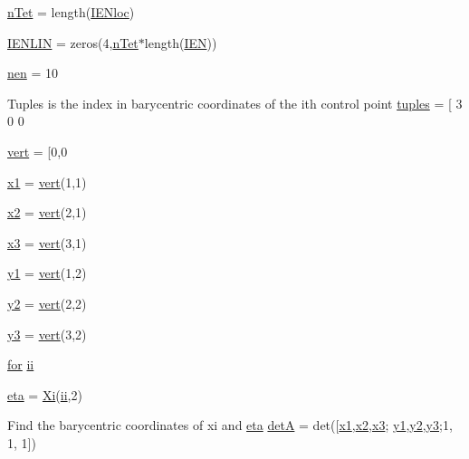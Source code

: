\begin{DoxyCompactItemize}
\item 
\hyperlink{a00605_a9e9784c690cbc435d91a2c0b5f2fea1c}{n\+Tet} = length(\hyperlink{a00605_ae3396d631c6896e8f9cb538bbd562cd6}{I\+E\+Nloc})
\item 
\hyperlink{a00605_a924f6afb8fc3a0c028349f92c93d4f22}{I\+E\+N\+L\+IN} = zeros(4,\hyperlink{a00605_a9e9784c690cbc435d91a2c0b5f2fea1c}{n\+Tet}$\ast$length(\hyperlink{a00608_ada37e689768b959686f183a3d534464b}{I\+EN}))
\item 
\hyperlink{a00605_acbbc42389c3587d1280ad7f1322035ba}{nen} = 10
\item 
Tuples is the index in barycentric coordinates of the ith control point \hyperlink{a00605_ae906280b3cb956d2555d33b882cca5bf}{tuples} = \mbox{[} 3 0 0
\item 
\hyperlink{a00605_a15bccd83c1e570e4a0ff17c42152989b}{vert} = \mbox{[}0,0
\item 
\hyperlink{a00605_ac39b33361203e68d7820336db48d45e6}{x1} = \hyperlink{a00605_a15bccd83c1e570e4a0ff17c42152989b}{vert}(1,1)
\item 
\hyperlink{a00605_aab2463cd078f7c5368f6eb80f5a549b8}{x2} = \hyperlink{a00605_a15bccd83c1e570e4a0ff17c42152989b}{vert}(2,1)
\item 
\hyperlink{a00605_a03ad2628eb1c540113251638112541e3}{x3} = \hyperlink{a00605_a15bccd83c1e570e4a0ff17c42152989b}{vert}(3,1)
\item 
\hyperlink{a00605_a7f911dc1dbbc41c6cae56357e8fb2230}{y1} = \hyperlink{a00605_a15bccd83c1e570e4a0ff17c42152989b}{vert}(1,2)
\item 
\hyperlink{a00605_a41b94b12b7cb45b3ddee299d4e7b79e8}{y2} = \hyperlink{a00605_a15bccd83c1e570e4a0ff17c42152989b}{vert}(2,2)
\item 
\hyperlink{a00605_ade1417f93b8addbf3d5a62e132e169fd}{y3} = \hyperlink{a00605_a15bccd83c1e570e4a0ff17c42152989b}{vert}(3,2)
\item 
\hyperlink{a00623_ad1e7380d51df1e0043d24d3c8a860e0a}{for} \hyperlink{a00605_abf9d47cd7d4fbc942e618bb1977019c2}{ii}
\item 
\hyperlink{a00605_a28acc4a90fe6ffb907aa145b7b01326a}{eta} = \hyperlink{a00605_a34d6ec2e729af94d4261c2243a358e05}{Xi}(\hyperlink{a00605_abf9d47cd7d4fbc942e618bb1977019c2}{ii},2)
\item 
Find the barycentric coordinates of xi and \hyperlink{a00605_a28acc4a90fe6ffb907aa145b7b01326a}{eta} \hyperlink{a00605_aa97829eaebbb0f0e581837cfa2ea9357}{detA} = det(\mbox{[}\hyperlink{a00605_ac39b33361203e68d7820336db48d45e6}{x1},\hyperlink{a00605_aab2463cd078f7c5368f6eb80f5a549b8}{x2},\hyperlink{a00605_a03ad2628eb1c540113251638112541e3}{x3}; \hyperlink{a00605_a7f911dc1dbbc41c6cae56357e8fb2230}{y1},\hyperlink{a00605_a41b94b12b7cb45b3ddee299d4e7b79e8}{y2},\hyperlink{a00605_ade1417f93b8addbf3d5a62e132e169fd}{y3};1, 1, 1\mbox{]})

\end{DoxyCompactItemize}
